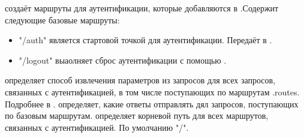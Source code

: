 \label{page-FPauth-core-module-FPauth+u+core-module-Make+u+Auth-module-Router-val-call}\begin{ocamlindent} создаёт маршруты для аутентификации, которые добавляются в .Содержит следующие базовые маршруты:\begin{itemize}\item{"/auth" является стартовой точкой для аутентификации. Передаёт  в \hyperref[page-FPauth-core-module-FPauth+u+core-module-Auth+u+sign-module-type-AUTHENTICATOR-val-authenticate]{}.}%
\item{"/logout" выаолняет сброс аутентификации с помощью \hyperref[page-FPauth-core-module-FPauth+u+core-module-Make+u+Auth-module-Authenticator-val-logout]{}.}\end{itemize}%
 определяет способ извлечения параметров из запросов для всех запросов, связанных с аутентификацией, в том числе поступающих по маршрутам .routes. Подробнее в \hyperref[page-FPauth-core-module-FPauth+u+core-module-Static-module-Params-type-extractor]{}. определяет, какие ответы отправлять дял запросов, поступающих по базовым маршрутам. определяет корневой путь для всех маршрутов, связанных с аутентификацией. По умолчанию "/".\end{ocamlindent}%
\medbreak


